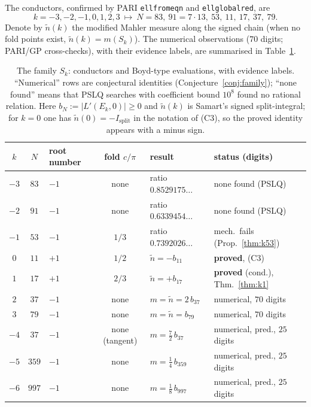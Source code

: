 \documentclass[11pt]{amsart}
\theoremstyle{definition}
\theoremstyle{remark}
\begin{document}
The conductors, confirmed by PARI \cite{PARI}
\texttt{ellfromeqn} and \texttt{ellglobalred}, are
\[
  k=-3,-2,-1,0,1,2,3\ \longmapsto\ N=83,\ 91=7\cdot13,\ 53,\ 11,\ 17,\ 37,\ 79.
\]
Denote by $\tilde n(k)$ the modified Mahler measure along the signed chain
(when no fold points exist, $\tilde n(k)=m(S_k)$). The numerical
observations ($70$ digits; PARI/GP cross-checks), with their evidence
labels, are summarised in Table~\ref{tab:family}.

\begin{table}[ht]
\centering\footnotesize
\begin{tabular}{@{}cclcll@{}}
\toprule
$k$ & $N$ & root number & fold $c/\pi$ & result & status (digits)\\
\midrule
$-3$ & $83$ & $-1$ & none & ratio $0.8529175\ldots$ & none found (PSLQ)\\
$-2$ & $91$ & $-1$ & none & ratio $0.6339454\ldots$ & none found (PSLQ)\\
$-1$ & $53$ & $-1$ & $1/3$ & ratio $0.7392026\ldots$ & mech.\ fails
  (Prop.~\ref{thm:k53})\\
$0$ & $11$ & $+1$ & $1/2$ & $\tilde n=-b_{11}$ & \textbf{proved}, (C3)\\
$1$ & $17$ & $+1$ & $2/3$ & $\tilde n=+b_{17}$ & \textbf{proved} (cond.),
  Thm.~\ref{thm:k1}\\
$2$ & $37$ & $-1$ & none & $m=\tilde n=2\,b_{37}$ & numerical, $70$ digits\\
$3$ & $79$ & $-1$ & none & $m=\tilde n=b_{79}$ & numerical, $70$ digits\\
$-4$ & $37$ & $-1$ & none (tangent) & $m=\tfrac72\,b_{37}$
  & numerical, pred., $25$ digits\\
$-5$ & $359$ & $-1$ & none & $m=\tfrac14\,b_{359}$
  & numerical, pred., $25$ digits\\
$-6$ & $997$ & $-1$ & none & $m=\tfrac18\,b_{997}$
  & numerical, pred., $25$ digits\\
\bottomrule
\end{tabular}
\caption{The family $S_k$: conductors and Boyd-type evaluations, with
evidence labels. ``Numerical'' rows are conjectural identities
(Conjecture~\ref{conj:family}); ``none found'' means that PSLQ searches
with coefficient bound $10^8$ found no rational relation.
Here $b_N:=|L'(E_k,0)|\ge0$ and $\tilde n(k)$ is Samart's signed
split-integral; for $k=0$ one has $\tilde n(0)=-I_{\mathrm{split}}$ in the
notation of \textup{(C3)}, so the proved identity appears with a minus sign.}
\label{tab:family}
\end{table}
\end{document}

